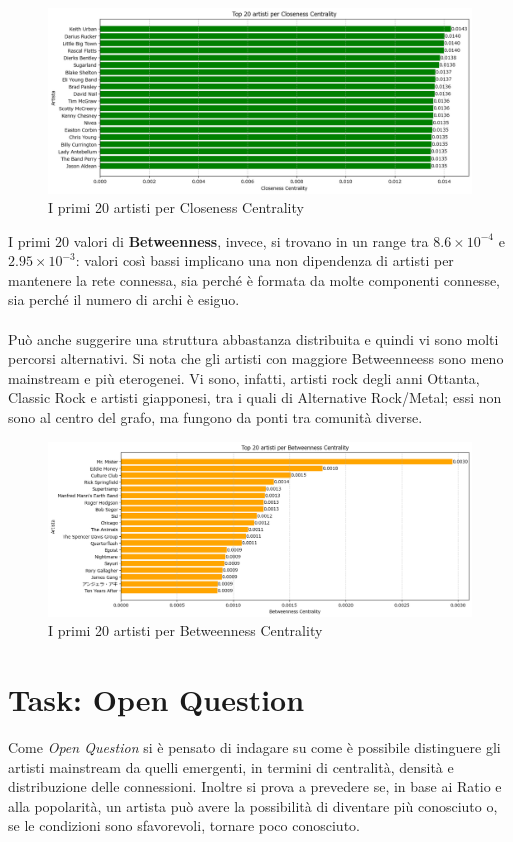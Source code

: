 \documentclass[sigchi]{acmart}
\begin{document}
\begin{figure}[H]
\centering
\includegraphics[width=0.45
\textwidth]{../network_analysis/plots/2_7/top20Clness.png}
\caption{I primi 20 artisti per Closeness Centrality}
\label{fig:top20Clness}
\end{figure}

\noindent I primi $20$ valori di {\bfseries Betweenness}, invece, si trovano in un range tra $8.6 \times 10^{-4}$ e $2.95 \times 10^{-3}$: valori così bassi implicano una non dipendenza di artisti per mantenere la rete connessa, sia perché è formata da molte componenti connesse, sia perché il numero di archi è esiguo. \\ \\ Può anche suggerire una struttura abbastanza distribuita e quindi vi sono molti percorsi alternativi. Si nota che gli artisti con maggiore Betweenneess sono meno mainstream e più eterogenei. Vi sono, infatti, artisti rock degli anni Ottanta, Classic Rock e artisti giapponesi, tra i quali di Alternative Rock/Metal; essi non sono al centro del grafo, ma fungono da ponti tra comunità diverse.

\begin{figure}[H]
\centering
\includegraphics[width=0.45
\textwidth]{../network_analysis/plots/2_7/top20Btwnss.png}
\caption{I primi 20 artisti per Betweenness Centrality}
\label{fig:top20Btwnss}
\end{figure}

\section{Task: Open Question}

Come {\itshape Open Question} si è pensato di indagare su come è possibile distinguere gli artisti mainstream da quelli emergenti, in termini di centralità, densità e distribuzione delle connessioni. Inoltre si prova a prevedere se, in base ai Ratio e alla popolarità, un artista può avere la possibilità di diventare più conosciuto o, se le condizioni sono sfavorevoli, tornare poco conosciuto.
\end{document}
